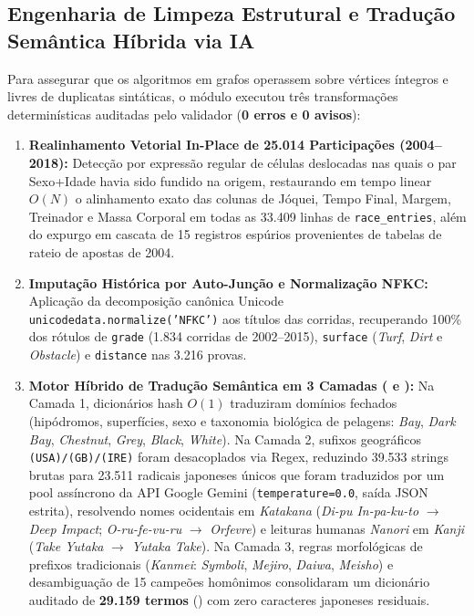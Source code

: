 \documentclass[conference]{IEEEtran}
\begin{document}
\subsection{Engenharia de Limpeza Estrutural e Tradução Semântica Híbrida via IA}
Para assegurar que os algoritmos em grafos operassem sobre vértices íntegros e livres de duplicatas sintáticas, o módulo  executou três transformações determinísticas auditadas pelo validador  (\textbf{0 erros e 0 avisos}):
\begin{enumerate}
    \item \textbf{Realinhamento Vetorial In-Place de 25.014 Participações (2004--2018):} Detecção por expressão regular de células deslocadas nas quais o par Sexo+Idade havia sido fundido na origem, restaurando em tempo linear $O(N)$ o alinhamento exato das colunas de Jóquei, Tempo Final, Margem, Treinador e Massa Corporal em todas as 33.409 linhas de \texttt{race\_entries}, além do expurgo em cascata de 15 registros espúrios provenientes de tabelas de rateio de apostas de 2004.
    \item \textbf{Imputação Histórica por Auto-Junção e Normalização NFKC:} Aplicação da decomposição canônica Unicode \texttt{unicodedata.normalize('NFKC')} aos títulos das corridas, recuperando 100\%
dos rótulos de \texttt{grade} (1.834 corridas de 2002--2015), \texttt{surface} (\textit{Turf}, \textit{Dirt} e \textit{Obstacle}) e \texttt{distance} nas 3.216 provas.
    \item \textbf{Motor Híbrido de Tradução Semântica em 3 Camadas ( e ):} Na Camada 1, dicionários hash $O(1)$ traduziram domínios fechados (hipódromos, superfícies, sexo e taxonomia biológica de pelagens: \textit{Bay}, \textit{Dark Bay}, \textit{Chestnut}, \textit{Grey}, \textit{Black}, \textit{White}). Na Camada 2, sufixos geográficos \texttt{(USA)/(GB)/(IRE)} foram desacoplados via Regex, reduzindo 39.533 strings brutas para 23.511 radicais japoneses únicos que foram traduzidos por um pool assíncrono da API Google Gemini (\texttt{temperature=0.0}, saída JSON estrita), resolvendo nomes ocidentais em \textit{Katakana} (\textit{Di-pu In-pa-ku-to} $\to$ \textit{Deep Impact}; \textit{O-ru-fe-vu-ru} $\to$ \textit{Orfevre}) e leituras humanas \textit{Nanori} em \textit{Kanji} (\textit{Take Yutaka} $\to$ \textit{Yutaka Take}). Na Camada 3, regras morfológicas de prefixos tradicionais (\textit{Kanmei}: \textit{Symboli}, \textit{Mejiro}, \textit{Daiwa}, \textit{Meisho}) e desambiguação de 15 campeões homônimos consolidaram um dicionário auditado de \textbf{29.159 termos} () com zero caracteres japoneses residuais.
\end{enumerate}
\end{document}
